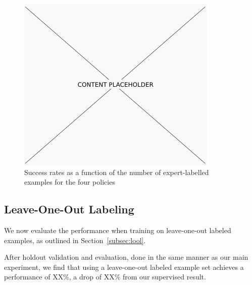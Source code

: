 \begin{figure}[h!]
  \centering
    \includegraphics[width=0.9\linewidth]{figures/placeholder.png}
  \caption{Success rates as a function of the number of expert-labelled examples for the four policies}
  \label{fig:number_examples}
\end{figure}

\subsection{Leave-One-Out Labeling}

We now evaluate the performance when training on leave-one-out labeled
examples, as outlined in Section~\ref{subsec:lool}.

After holdout validation and evaluation, done in the same manner as our main
experiment, we find that using a leave-one-out labeled example set achieves a
performance of XX\%, a drop of XX\% from our supervised result.
